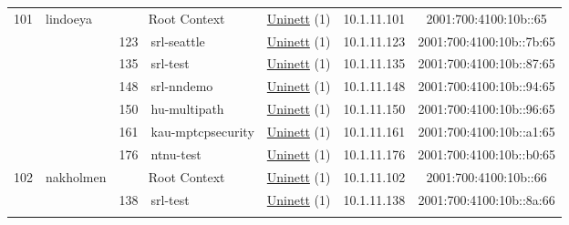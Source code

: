 \begin{small}
\begin{center}
\begin{longtable}{|c|c|c|c|c|c|c|c|}
 \multirow{7}{*}{\tiny{101}} & \multicolumn{1}{|l|}{\multirow{7}{*}{\tiny{lindoeya}}} & \multicolumn{2}{|c|}{\tiny{Root Context}} & \multicolumn{2}{|c|}{\tiny{\href{https://www.uninett.no}{Uninett} (1)}} & \tiny{10.1.11.101} & \tiny{2001:700:4100:10b::65} \\* \cline{3-3}\cline{4-4}\cline{5-5}\cline{6-6}\cline{7-7}\cline{8-8}
  &  & \tiny{123} & \multicolumn{1}{|l|}{\tiny{srl-seattle}} & \multicolumn{2}{|c|}{\tiny{\href{https://www.uninett.no}{Uninett} (1)}} & \tiny{10.1.11.123} & \tiny{2001:700:4100:10b::7b:65} \\* \cline{3-3}\cline{4-4}\cline{5-5}\cline{6-6}\cline{7-7}\cline{8-8}
  &  & \tiny{135} & \multicolumn{1}{|l|}{\tiny{srl-test}} & \multicolumn{2}{|c|}{\tiny{\href{https://www.uninett.no}{Uninett} (1)}} & \tiny{10.1.11.135} & \tiny{2001:700:4100:10b::87:65} \\* \cline{3-3}\cline{4-4}\cline{5-5}\cline{6-6}\cline{7-7}\cline{8-8}
  &  & \tiny{148} & \multicolumn{1}{|l|}{\tiny{srl-nndemo}} & \multicolumn{2}{|c|}{\tiny{\href{https://www.uninett.no}{Uninett} (1)}} & \tiny{10.1.11.148} & \tiny{2001:700:4100:10b::94:65} \\* \cline{3-3}\cline{4-4}\cline{5-5}\cline{6-6}\cline{7-7}\cline{8-8}
  &  & \tiny{150} & \multicolumn{1}{|l|}{\tiny{hu-multipath}} & \multicolumn{2}{|c|}{\tiny{\href{https://www.uninett.no}{Uninett} (1)}} & \tiny{10.1.11.150} & \tiny{2001:700:4100:10b::96:65} \\* \cline{3-3}\cline{4-4}\cline{5-5}\cline{6-6}\cline{7-7}\cline{8-8}
  &  & \tiny{161} & \multicolumn{1}{|l|}{\tiny{kau-mptcpsecurity}} & \multicolumn{2}{|c|}{\tiny{\href{https://www.uninett.no}{Uninett} (1)}} & \tiny{10.1.11.161} & \tiny{2001:700:4100:10b::a1:65} \\* \cline{3-3}\cline{4-4}\cline{5-5}\cline{6-6}\cline{7-7}\cline{8-8}
  &  & \tiny{176} & \multicolumn{1}{|l|}{\tiny{ntnu-test}} & \multicolumn{2}{|c|}{\tiny{\href{https://www.uninett.no}{Uninett} (1)}} & \tiny{10.1.11.176} & \tiny{2001:700:4100:10b::b0:65} \\ \hline
 \multirow{8}{*}{\tiny{102}} & \multicolumn{1}{|l|}{\multirow{8}{*}{\tiny{nakholmen}}} & \multicolumn{2}{|c|}{\tiny{Root Context}} & \multicolumn{2}{|c|}{\tiny{\href{https://www.uninett.no}{Uninett} (1)}} & \tiny{10.1.11.102} & \tiny{2001:700:4100:10b::66} \\* \cline{3-3}\cline{4-4}\cline{5-5}\cline{6-6}\cline{7-7}\cline{8-8}
  &  & \tiny{138} & \multicolumn{1}{|l|}{\tiny{srl-test}} & \multicolumn{2}{|c|}{\tiny{\href{https://www.uninett.no}{Uninett} (1)}} & \tiny{10.1.11.138} & \tiny{2001:700:4100:10b::8a:66} \\* \cline{3-3}\cline{4-4}\cline{5-5}\cline{6-6}\cline{7-7}\cline{8-8}

\end{longtable}
\end{center}
\end{small}
